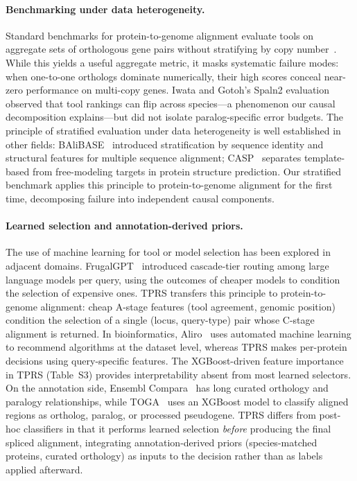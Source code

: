 \paragraph{Benchmarking under data heterogeneity.}
Standard benchmarks for protein-to-genome alignment evaluate tools on aggregate sets of orthologous gene pairs without stratifying by copy number~\cite{iwata2012spaln2,scalzitti2020g3po,freedman2025annotation,hou2024searchassessment}. While this yields a useful aggregate metric, it masks systematic failure modes: when one-to-one orthologs dominate numerically, their high scores conceal near-zero performance on multi-copy genes. Iwata and Gotoh's Spaln2 evaluation~\cite{iwata2012spaln2} observed that tool rankings can flip across species—a phenomenon our causal decomposition explains—but did not isolate paralog-specific error budgets. The principle of stratified evaluation under data heterogeneity is well established in other fields: BAliBASE~\cite{thompson2005balibase} introduced stratification by sequence identity and structural features for multiple sequence alignment; CASP~\cite{moult2018casp13} separates template-based from free-modeling targets in protein structure prediction. Our stratified benchmark applies this principle to protein-to-genome alignment for the first time, decomposing failure into independent causal components.

\paragraph{Learned selection and annotation-derived priors.}
The use of machine learning for tool or model selection has been explored in adjacent domains. FrugalGPT~\cite{chen2023frugalgpt} introduced cascade-tier routing among large language models per query, using the outcomes of cheaper models to condition the selection of expensive ones. TPRS transfers this principle to protein-to-genome alignment: cheap A-stage features (tool agreement, genomic position) condition the selection of a single (locus, query-type) pair whose C-stage alignment is returned. In bioinformatics, Aliro~\cite{lacava2023aliro} uses automated machine learning to recommend algorithms at the dataset level, whereas TPRS makes per-protein decisions using query-specific features. The XGBoost-driven feature importance in TPRS (Table~S3) provides interpretability absent from most learned selectors. On the annotation side, Ensembl Compara~\cite{vilella2009ensembl,herrero2016ensembl} has long curated orthology and paralogy relationships, while TOGA~\cite{kirilenko2023toga} uses an XGBoost model to classify aligned regions as ortholog, paralog, or processed pseudogene. TPRS differs from post-hoc classifiers in that it performs learned selection \emph{before} producing the final spliced alignment, integrating annotation-derived priors (species-matched proteins, curated orthology) as inputs to the decision rather than as labels applied afterward.

